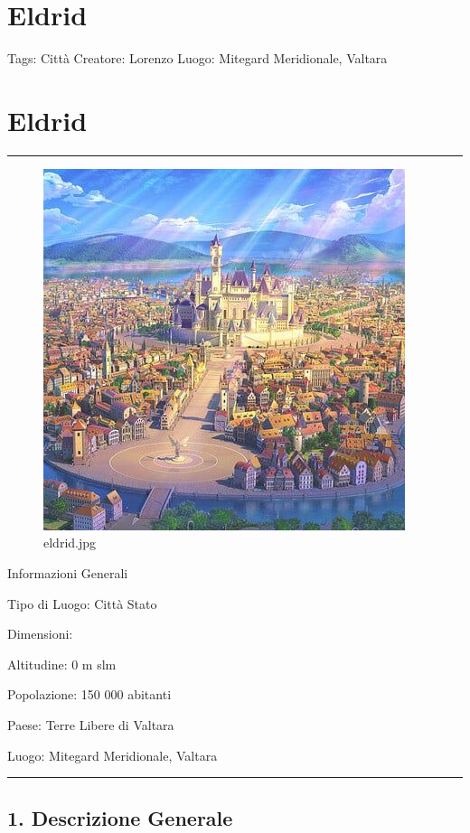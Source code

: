\section{Eldrid}\label{eldrid}

Tags: Città Creatore: Lorenzo Luogo: Mitegard Meridionale, Valtara

\section{Eldrid}\label{eldrid-1}

\begin{center}\rule{0.5\linewidth}{0.5pt}\end{center}

\begin{figure}
\centering
\includegraphics{eldrid.jpg}
\caption{eldrid.jpg}
\end{figure}

Informazioni Generali

Tipo di Luogo: Città Stato

Dimensioni:

Altitudine: 0 m slm

Popolazione: 150 000 abitanti

Paese: Terre Libere di Valtara

Luogo: Mitegard Meridionale, Valtara

\begin{center}\rule{0.5\linewidth}{0.5pt}\end{center}

\subsection{1. Descrizione Generale}\label{descrizione-generale}

